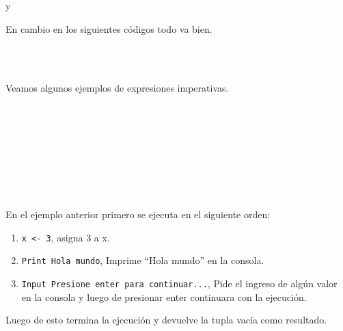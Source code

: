       y
      
      \begin{fxcode}
      \end{fxcode}
      
      En cambio en los siguientes códigos todo va bien.
      
      \begin{fxcode}
      \end{fxcode}
      
      \begin{fxcode}
         \\
         \\
      \end{fxcode}
      
      Veamos algunos ejemplos de expresiones imperativas.
      
      \begin{fxcode}
         \\
         \\
         \\
         \\
         \\
         \\
         \\
         \outcode{()}
      \end{fxcode}
   
      En el ejemplo anterior primero se ejecuta en el siguiente orden:
      
      \begin{enumerate}
         \item \texttt{x <- 3}, asigna $3$ a x.
         \item \texttt{Print \textquotedbl Hola mundo\textquotedbl}, Imprime ``Hola mundo'' en la consola.
         \item \texttt{Input \textquotedbl Presione enter para continuar...\textquotedbl}, Pide el ingreso de algún valor en la consola y luego de presionar enter continuara con la ejecución.
      \end{enumerate}
      
      Luego de esto termina la ejecución y devuelve la tupla vacía como resultado.
      

